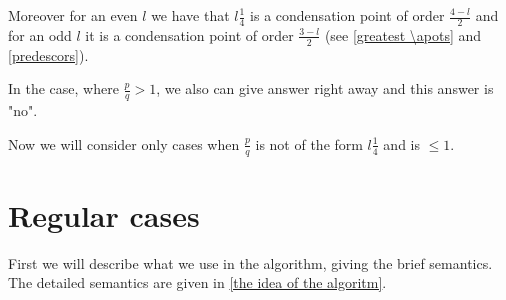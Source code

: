 Moreover for an even $l$ we have that $l\frac{1}{4}$ is a condensation point of order 
$\frac{4-l}{2}$ 
and for an odd $l$ it is a condensation point of order $\frac{3-l}{2}$ (see \ref{greatest \apots} 
and \ref{predescors}). 

In the case, where $\frac{p}{q} > 1$, we also can give answer right away and this answer is "no". 

Now we will consider only cases when $\frac{p}{q}$ is not of the form $l\frac{1}{4}$ and is 
$\leq 1$.
%
%
%
%
%
%
\section{Regular cases}
First we will describe what we use in the algorithm, giving the brief semantics. 
The detailed semantics are given in \ref{the idea of the algoritm}.
